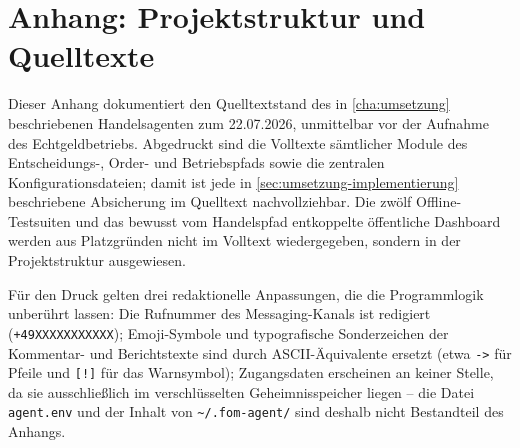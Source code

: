 %
%

\chapter{Anhang: Projektstruktur und Quelltexte}
\label{cha:anhang-quelltexte}


Dieser Anhang dokumentiert den Quelltextstand des in \cref{cha:umsetzung}
beschriebenen Handelsagenten zum 22.07.2026, unmittelbar vor der Aufnahme des
Echtgeldbetriebs. Abgedruckt sind die Volltexte sämtlicher Module des
Entscheidungs-, Order- und Betriebspfads sowie die zentralen
Konfigurationsdateien; damit ist jede in \cref{sec:umsetzung-implementierung}
beschriebene Absicherung im Quelltext nachvollziehbar. Die zwölf
Offline-Testsuiten und das bewusst vom Handelspfad entkoppelte öffentliche
Dashboard werden aus Platzgründen nicht im Volltext wiedergegeben, sondern in
der Projektstruktur ausgewiesen.

Für den Druck gelten drei redaktionelle Anpassungen, die die Programmlogik
unberührt lassen: Die Rufnummer des Messaging-Kanals ist redigiert
(\texttt{+49XXXXXXXXXXX}); Emoji-Symbole und typografische Sonderzeichen der
Kommentar- und Berichtstexte sind durch ASCII-Äquivalente ersetzt (etwa
\texttt{->} für Pfeile und \texttt{[!]} für das Warnsymbol); Zugangsdaten
erscheinen an keiner Stelle, da sie ausschließlich im verschlüsselten
Geheimnisspeicher liegen -- die Datei \texttt{agent.env} und der Inhalt von
\texttt{\textasciitilde/.fom-agent/} sind deshalb nicht Bestandteil des
Anhangs.

